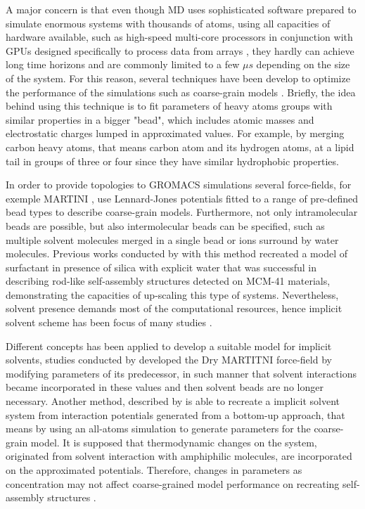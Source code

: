 \documentclass[10pt,a4paper,twoside]{article}
\begin{document}
A major concern is that even though MD uses sophisticated software prepared to simulate enormous systems with thousands of atoms, using all capacities of hardware available, such as high-speed multi-core processors in conjunction with GPUs designed specifically to process data from arrays \cite{gromacs}, they hardly can achieve long time horizons and are commonly limited to a few $\mu s$ depending on the size of the system. For this reason, several techniques have been develop to optimize the performance of the simulations such as coarse-grain models \cite{someone}. Briefly, the idea behind using this technique is to fit parameters of heavy atoms groups with similar properties in a bigger "bead", which includes atomic masses and electrostatic charges lumped in approximated values. For example, by merging carbon heavy atoms, that means carbon atom and its hydrogen atoms, at a lipid tail in groups of three or four since they have similar hydrophobic properties. 

In order to provide topologies to GROMACS simulations several force-fields, for exemple MARTINI \cite{martini}, use Lennard-Jones potentials fitted to a range of pre-defined bead types to describe coarse-grain models. Furthermore, not only intramolecular beads are possible, but also intermolecular beads can be specified, such as multiple solvent molecules merged in a single bead or ions surround by water molecules. Previous works conducted by \cite{mjsilica} with this method recreated a model of surfactant in presence of silica with explicit water that was successful in describing rod-like self-assembly structures detected on MCM-41 materials, demonstrating the capacities of up-scaling this type of systems. Nevertheless, solvent presence demands most of the computational resources, hence  implicit solvent scheme has been focus of many studies \cite{gromacs}.

Different concepts has been applied to develop a suitable model for implicit solvents, studies conducted by  developed the Dry MARTITNI force-field by modifying parameters of its predecessor, in such manner that solvent interactions became incorporated in these values and then solvent beads are no longer necessary. Another method, described by \cite{magic} is able to recreate a implicit solvent system from interaction potentials generated from a bottom-up approach, that means by using an all-atoms simulation to generate parameters for the coarse-grain model. It is supposed  that thermodynamic changes on the system, originated from solvent interaction with amphiphilic molecules, are incorporated on the approximated potentials. Therefore, changes in parameters as concentration may not affect coarse-grained model performance on recreating self-assembly structures \cite{dmpc}.
\end{document}
